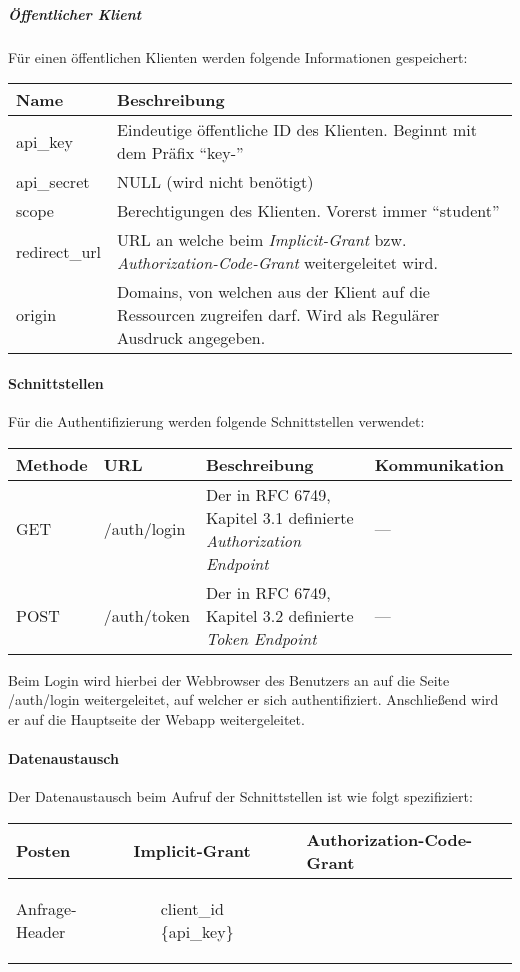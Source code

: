 \subparagraph{Öffentlicher Klient}
Für einen öffentlichen Klienten werden folgende Informationen gespeichert:\\
\begin{tabularx}{\textwidth}{@{} | X | X | @{}}
	\hline
	\textbf{Name} & \textbf{Beschreibung}\\ \hline \hline
	api\_key & Eindeutige öffentliche ID des Klienten. Beginnt mit dem Präfix \enquote{key-} \\ \hline
	api\_secret & NULL (wird nicht benötigt) \\ \hline
	scope & Berechtigungen des Klienten. Vorerst immer \enquote{student} \\ \hline
	redirect\_url & URL an welche beim \textit{Implicit-Grant} bzw. \textit{Authorization-Code-Grant} weitergeleitet wird. \\ \hline
	origin & Domains, von welchen aus der Klient auf die Ressourcen zugreifen darf. Wird als Regulärer Ausdruck angegeben. \\
	\hline
\end{tabularx}
\paragraph{Schnittstellen}
Für die Authentifizierung werden folgende Schnittstellen verwendet:
\begin{table}
	\begin{tabularx}{\textwidth}{@{} | X | X | X | X | @{}}
		\hline
		\textbf{Methode} & \textbf{URL} & \textbf{Beschreibung} & \textbf{Kommunikation} \\ \hline \hline
		GET & /auth/login & Der in RFC 6749, Kapitel 3.1 definierte \textit{Authorization Endpoint} & --- \\ \hline
		POST & /auth/token & Der in RFC 6749, Kapitel 3.2 definierte \textit{Token Endpoint} & --- \\ \hline
	\end{tabularx}
\end{table}
Beim Login wird hierbei der Webbrowser des Benutzers an auf die Seite /auth/login weitergeleitet, auf welcher er sich authentifiziert. Anschließend wird er auf die Hauptseite der Webapp weitergeleitet.
\paragraph{Datenaustausch}
Der Datenaustausch beim Aufruf der Schnittstellen ist wie folgt spezifiziert:\\
\begin{tabularx}{\textwidth}{@{} | X | X | X | @{}}
	\hline
	\textbf{Posten} & \textbf{Implicit-Grant} & \textbf{Authorization-Code-Grant} \\ \hline
	Anfrage-Header &
	\begin{itemize}
		\item[]
		\item[client\_id] \{api\_key\}
	\end{itemize} & \\
\end{tabularx}